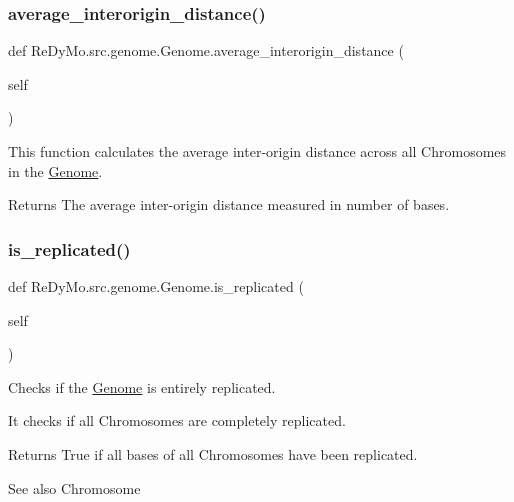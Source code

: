 \subsubsection{\texorpdfstring{average\+\_\+interorigin\+\_\+distance()}{average\_interorigin\_distance()}}
{\footnotesize\ttfamily def Re\+Dy\+Mo.\+src.\+genome.\+Genome.\+average\+\_\+interorigin\+\_\+distance (\begin{DoxyParamCaption}\item[{}]{self }\end{DoxyParamCaption})}



This function calculates the average inter-\/origin distance across all Chromosomes in the \mbox{\hyperlink{classReDyMo_1_1src_1_1genome_1_1Genome}{Genome}}. 

\begin{DoxyReturn}{Returns}
The average inter-\/origin distance measured in number of bases. 
\end{DoxyReturn}
\mbox{\label{classReDyMo_1_1src_1_1genome_1_1Genome_a8351b706fc6f5c0f218c1dab6c04da46}} 
\subsubsection{\texorpdfstring{is\+\_\+replicated()}{is\_replicated()}}
{\footnotesize\ttfamily def Re\+Dy\+Mo.\+src.\+genome.\+Genome.\+is\+\_\+replicated (\begin{DoxyParamCaption}\item[{}]{self }\end{DoxyParamCaption})}



Checks if the \mbox{\hyperlink{classReDyMo_1_1src_1_1genome_1_1Genome}{Genome}} is entirely replicated. 

It checks if all Chromosomes are completely replicated. \begin{DoxyReturn}{Returns}
True if all bases of all Chromosomes have been replicated. 
\end{DoxyReturn}
\begin{DoxySeeAlso}{See also}
Chromosome 
\end{DoxySeeAlso}
\mbox{\label{classReDyMo_1_1src_1_1genome_1_1Genome_a52ff5976c29d7f3308634d1806f0e6e5}} 
